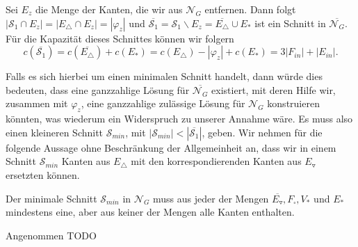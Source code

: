 Sei $E_z$ die Menge der Kanten, die wir aus $\mathcal{N}_G$ entfernen. Dann folgt $|\mathcal{S}_1 \cap E_z| = |E_\triangle \cap E_z| = |\varphi_z|$ und $\overline{\mathcal{S}_1} = \mathcal{S}_1 \backslash E_z = \overline{E_\triangle} \cup E_*$ ist ein Schnitt in $\overline{\mathcal{N}_G}$. Für die Kapazität dieses Schnittes können wir folgern 
$$ c(\overline{\mathcal{S}_1}) = c(\overline{E_\triangle}) + c(E_*) = c(E_\triangle) - |\varphi_z| + c(E_*) = 3|F_{in}| + |E_{in}|.$$

Falls es sich hierbei um einen minimalen Schnitt handelt, dann würde dies bedeuten, dass eine ganzzahlige Lösung für $\overline{\mathcal{N}_G}$ existiert, mit deren Hilfe wir, zusammen mit $\varphi_z$, eine ganzzahlige zulässige Lösung für $\mathcal{N}_G$ konstruieren könnten, was wiederum ein Widerspruch zu unserer Annahme wäre. Es muss also einen kleineren Schnitt $\mathcal{S}_{min}$, mit $|\mathcal{S}_{min}| < |\overline{\mathcal{S}_1}|$, geben. Wir nehmen für die folgende Aussage  ohne Beschränkung der Allgemeinheit an, dass wir in einem Schnitt $\mathcal{S}_{min}$ Kanten aus $E_\triangle$ mit den korrespondierenden Kanten aus $E_\triangledown$ ersetzten können.

\begin{claim}

Der minimale Schnitt $\mathcal{S}_{min}$ in $\mathcal{N}_G$ muss aus jeder der Mengen $\overline{E_\triangledown}, F_\square, V_*$ und $E_*$ mindestens eine, aber aus keiner der Mengen alle Kanten enthalten.

\end{claim}

Angenommen  TODO




